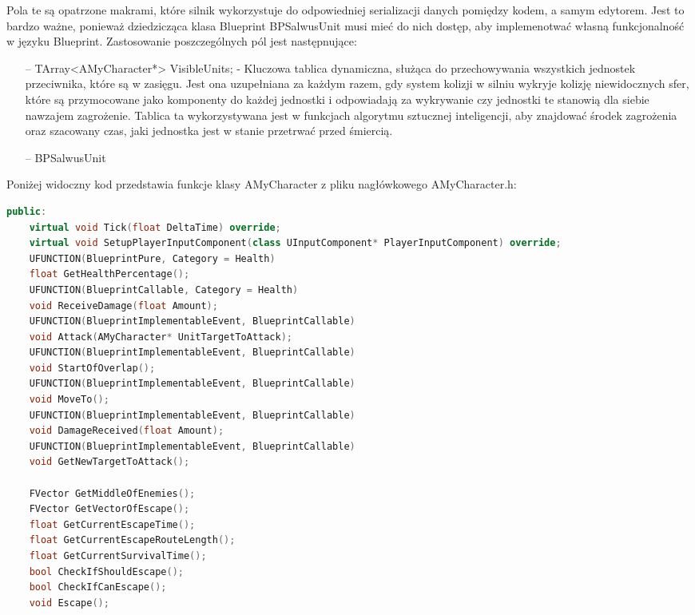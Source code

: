 \documentclass[12pt]{report}
\begin{document}
Pola te są opatrzone makrami, które silnik wykorzystuje do odpowiedniej serializacji danych pomiędzy kodem, a samym edytorem. Jest to bardzo ważne, ponieważ dziedzicząca klasa Blueprint BPSalwusUnit musi mieć do nich dostęp, aby implemenotwać własną funkcjonalność w języku Blueprint. Zastosowanie poszczególnych pól jest następnujące:
\begin{itemize}
\item[--] TArray<AMyCharacter*> VisibleUnits; - Kluczowa tablica dynamiczna, służąca do przechowywania wszystkich jednostek przeciwnika, które są w zasięgu. Jest ona uzupełniana za każdym razem, gdy system kolizji w silniu wykryje kolizję niewidocznych sfer, które są przymocowane jako komponenty do każdej jednostki i odpowiadają za wykrywanie czy jednostki te stanowią dla siebie nawzajem zagrożenie. Tablica ta wykorzystywana jest w funkcjach algorytmu sztucznej inteligencji, aby znajdować środek zagrożenia oraz szacowany czas, jaki jednostka jest w stanie przetrwać przed śmiercią.
\item[--] BPSalwusUnit
\end{itemize}


Poniżej widoczny kod przedstawia funkcje klasy AMyCharacter z pliku nagłówkowego AMyCharacter.h: 
\begin{lstlisting}[language=C++, backgroundcolor=\color{black!5}, basicstyle=\footnotesize, caption=Publiczne pola klasy AMyCharacter]
public:
	virtual void Tick(float DeltaTime) override;
	virtual void SetupPlayerInputComponent(class UInputComponent* PlayerInputComponent) override;
	UFUNCTION(BlueprintPure, Category = Health)
	float GetHealthPercentage();
	UFUNCTION(BlueprintCallable, Category = Health)
	void ReceiveDamage(float Amount);
	UFUNCTION(BlueprintImplementableEvent, BlueprintCallable)
	void Attack(AMyCharacter* UnitTargetToAttack);
	UFUNCTION(BlueprintImplementableEvent, BlueprintCallable)
	void StartOfOverlap();
	UFUNCTION(BlueprintImplementableEvent, BlueprintCallable)
	void MoveTo();
	UFUNCTION(BlueprintImplementableEvent, BlueprintCallable)
	void DamageReceived(float Amount);
	UFUNCTION(BlueprintImplementableEvent, BlueprintCallable)
	void GetNewTargetToAttack();

	FVector GetMiddleOfEnemies();
	FVector GetVectorOfEscape();
	float GetCurrentEscapeTime();
	float GetCurrentEscapeRouteLength();
	float GetCurrentSurvivalTime();
	bool CheckIfShouldEscape();
	bool CheckIfCanEscape();
	void Escape();
\end{lstlisting}
\end{document}
